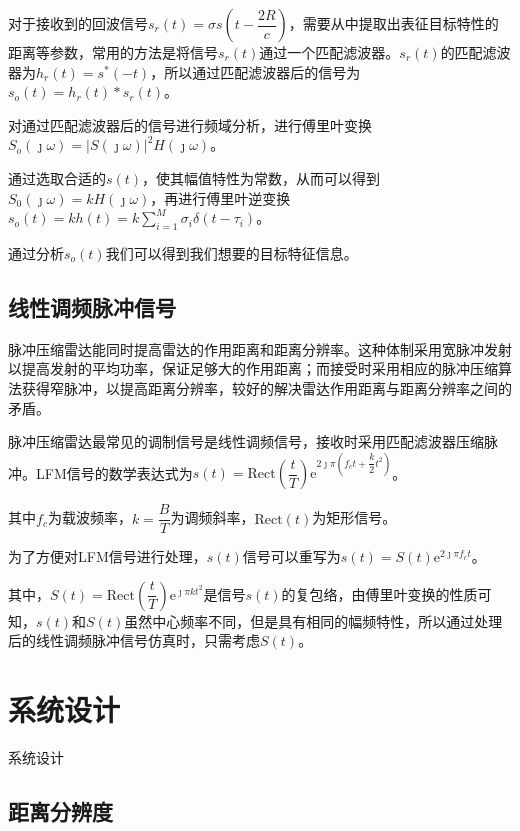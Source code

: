 \documentclass{article}
\newcounter{sub}
\begin{document}
对于接收到的回波信号$ s_r(t)=\sigma s(t-\dfrac{2R}{c}) $，需要从中提取出表征目标特性的距离等参数，常用的方法是将信号$ s_r(t) $通过一个匹配滤波器。$ s_r(t) $的匹配滤波器为$ h_r(t)=s^*(-t) $，所以通过匹配滤波器后的信号为$ s_o(t)=h_r(t)*s_r(t) $。

对通过匹配滤波器后的信号进行频域分析，进行傅里叶变换$ S_o(\jmath\omega)=|S(\jmath\omega)|^2H(\jmath\omega) $。

通过选取合适的$ s(t) $，使其幅值特性为常数，从而可以得到$ S_0(\jmath\omega)=kH(\jmath\omega) $，再进行傅里叶逆变换$ s_o(t)=kh(t)=k\sum\limits_{i=1}^M\sigma_i\delta(t-\tau_i) $。

通过分析$ s_o(t) $我们可以得到我们想要的目标特征信息。

\subsection{线性调频脉冲信号}%
\label{sub:线性调频脉冲信号}

脉冲压缩雷达能同时提高雷达的作用距离和距离分辨率。这种体制采用宽脉冲发射以提高发射的平均功率，保证足够大的作用距离；而接受时采用相应的脉冲压缩算法获得窄脉冲，以提高距离分辨率，较好的解决雷达作用距离与距离分辨率之间的矛盾。

脉冲压缩雷达最常见的调制信号是线性调频信号，接收时采用匹配滤波器压缩脉冲。LFM信号的数学表达式为$ s(t)=\mathrm{Rect}(\dfrac{t}{T})\mathrm{e}^{2\jmath\pi(f_ct+\dfrac{k}{2}t^2) } $。

其中$ f_c $为载波频率，$ k=\dfrac{B}{T} $为调频斜率，$ \mathrm{Rect}(t) $为矩形信号。

为了方便对LFM信号进行处理，$ s(t) $信号可以重写为$ s(t)=S(t) \mathrm{e}^{2\jmath\pi f_ct} $。

其中，$ S(t)= \mathrm{Rect}(\dfrac{t}{T}) \mathrm{e}^{\jmath\pi kt^2} $是信号$ s(t) $的复包络，由傅里叶变换的性质可知，$ s(t) $和$ S(t) $虽然中心频率不同，但是具有相同的幅频特性，所以通过处理后的线性调频脉冲信号仿真时，只需考虑$ S(t) $。

\section{系统设计}%
\label{sec:系统设计}

\begin{table}[H]
	\centering
	\caption{系统设计}
	\label{tab:系统设计}
\end{table}

\subsection{距离分辨度}%
\label{sub:距离分辨度}
\end{document}
